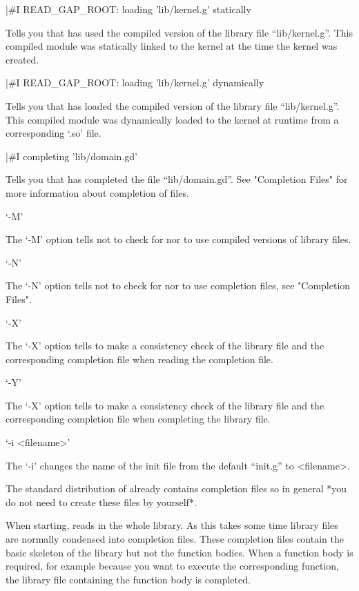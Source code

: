 \begintt
    |#I  READ_GAP_ROOT: loading 'lib/kernel.g' statically
\endtt

Tells you that {\GAP}  has used the compiled  version of the library file
``lib/kernel.g''.  This compiled    module was statically linked to   the
{\GAP} kernel at the time the kernel was created.

\begintt
    |#I  READ_GAP_ROOT: loading 'lib/kernel.g' dynamically
\endtt

Tells you that {\GAP} has loaded the compiled version of the library file
``lib/kernel.g''.   This compiled module  was  dynamically loaded to  the
{\GAP} kernel at runtime from a corresponding `.so' file.

\begintt
    |#I  completing 'lib/domain.gd'
\endtt

Tells you   that {\GAP} has   completed the file  ``lib/domain.gd''.  See
"Completion Files" for more information about completion of files.

`-M'

The `-M' option  tells  {\GAP}  not to check   for  nor to  use  compiled
versions of library files.

`-N'

The `-N' option tells  {\GAP}  not to check   for nor to use   completion
files, see "Completion Files".

`-X'

The `-X' option  tells {\GAP} to make  a consistency check of the library
file and the corresponding completion   file when reading the  completion
file.

`-Y'

The `-X' option tells {\GAP}  to make a  consistency check of the library
file and  the corresponding completion  file  when completing the library
file.

`-i <filename>'

The `-i' changes the name of the init file from the default ``init.g'' to
<filename>.


The standard distribution of {\GAP} already  contains completion files so
in general *you do not need to create these files by yourself*.

When starting, {\GAP} reads  in the  whole  library.  As this takes  some
time library files are  normally condensed into  completion files.  These
completion files contain the  basic skeleton of  the library but  not the
function bodies.   When a function  body is required, for example because
you  want   to  execute the  corresponding    function, the  library file
containing the function body is completed.

